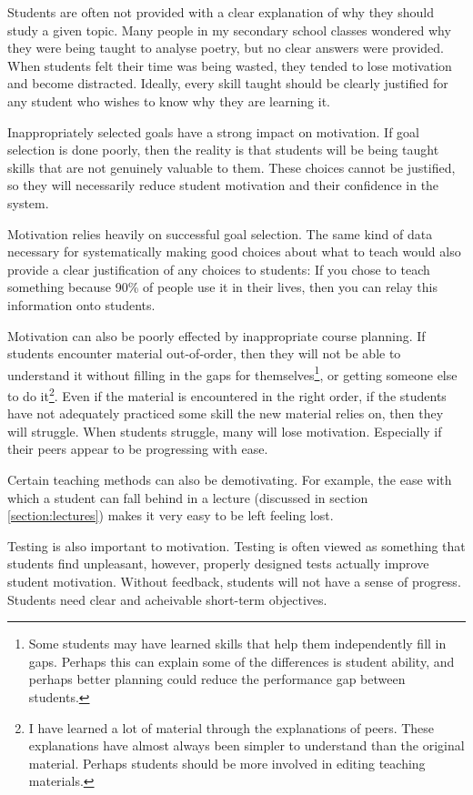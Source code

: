       Students are often not provided with a clear explanation of why they should study a given topic. Many people in my secondary school classes wondered why they were being taught to analyse poetry, but no clear answers were provided. When students felt their time was being wasted, they tended to lose motivation and become distracted. Ideally, every skill taught should be clearly justified for any student who wishes to know why they are learning it.

      Inappropriately selected goals have a strong impact on motivation. If goal selection is done poorly, then the reality is that students will be being taught skills that are not genuinely valuable to them. These choices cannot be justified, so they will necessarily reduce student motivation and their confidence in the system.

      Motivation relies heavily on successful goal selection. The same kind of data necessary for systematically making good choices about what to teach would also provide a clear justification of any choices to students: If you chose to teach something because 90\% of people use it in their lives, then you can relay this information onto students.

      Motivation can also be poorly effected by inappropriate course planning. If students encounter material out-of-order, then they will not be able to understand it without filling in the gaps for themselves\footnote{Some students may have learned skills that help them independently fill in gaps. Perhaps this can explain some of the differences is student ability, and perhaps better planning could reduce the performance gap between students.}, or getting someone else to do it\footnote{I have learned a lot of material through the explanations of peers. These explanations have almost always been simpler to understand than the original material. Perhaps students should be more involved in editing teaching materials.}. Even if the material is encountered in the right order, if the students have not adequately practiced some skill the new material relies on, then they will struggle. When students struggle, many will lose motivation. Especially if their peers appear to be progressing with ease.

      Certain teaching methods can also be demotivating. For example, the ease with which a student can fall behind in a lecture (discussed in section \ref{section:lectures}) makes it very easy to be left feeling lost.

      Testing is also important to motivation. Testing is often viewed as something that students find unpleasant, however, properly designed tests actually improve student motivation. Without feedback, students will not have a sense of progress. Students need clear and acheivable short-term objectives.\cite[pa.~14]{tgat}

